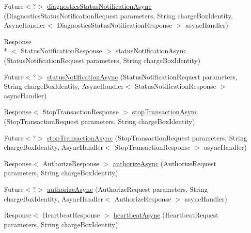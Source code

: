 \begin{DoxyCompactItemize}
\item 
Future$<$?$>$ \hyperlink{classde_1_1rwth_1_1idsg_1_1steve_1_1ocpp_1_1soap_1_1_central_system_service12___soap_server_aa0eab89a8d855dfead2864e84405eb81}{diagnostics\-Status\-Notification\-Async} (Diagnostics\-Status\-Notification\-Request parameters, String charge\-Box\-Identity, Async\-Handler$<$ Diagnostics\-Status\-Notification\-Response $>$ async\-Handler)
\item 
Response\\*
$<$ Status\-Notification\-Response $>$ \hyperlink{classde_1_1rwth_1_1idsg_1_1steve_1_1ocpp_1_1soap_1_1_central_system_service12___soap_server_a2b6c990a4cb7b6721e5d2ea894f4d080}{status\-Notification\-Async} (Status\-Notification\-Request parameters, String charge\-Box\-Identity)
\item 
Future$<$?$>$ \hyperlink{classde_1_1rwth_1_1idsg_1_1steve_1_1ocpp_1_1soap_1_1_central_system_service12___soap_server_a2fd311dcc151cea8dc5ef73b47467f0c}{status\-Notification\-Async} (Status\-Notification\-Request parameters, String charge\-Box\-Identity, Async\-Handler$<$ Status\-Notification\-Response $>$ async\-Handler)
\item 
Response$<$ Stop\-Transaction\-Response $>$ \hyperlink{classde_1_1rwth_1_1idsg_1_1steve_1_1ocpp_1_1soap_1_1_central_system_service12___soap_server_a47c89e5c2a769646d99add8a00884970}{stop\-Transaction\-Async} (Stop\-Transaction\-Request parameters, String charge\-Box\-Identity)
\item 
Future$<$?$>$ \hyperlink{classde_1_1rwth_1_1idsg_1_1steve_1_1ocpp_1_1soap_1_1_central_system_service12___soap_server_ade5a75436a3231a5524333716f73c999}{stop\-Transaction\-Async} (Stop\-Transaction\-Request parameters, String charge\-Box\-Identity, Async\-Handler$<$ Stop\-Transaction\-Response $>$ async\-Handler)
\item 
Response$<$ Authorize\-Response $>$ \hyperlink{classde_1_1rwth_1_1idsg_1_1steve_1_1ocpp_1_1soap_1_1_central_system_service12___soap_server_a0624d94fff1c8dfbb12965a161948fb3}{authorize\-Async} (Authorize\-Request parameters, String charge\-Box\-Identity)
\item 
Future$<$?$>$ \hyperlink{classde_1_1rwth_1_1idsg_1_1steve_1_1ocpp_1_1soap_1_1_central_system_service12___soap_server_ab40e495892f28bfb2d868cbf11334cde}{authorize\-Async} (Authorize\-Request parameters, String charge\-Box\-Identity, Async\-Handler$<$ Authorize\-Response $>$ async\-Handler)
\item 
Response$<$ Heartbeat\-Response $>$ \hyperlink{classde_1_1rwth_1_1idsg_1_1steve_1_1ocpp_1_1soap_1_1_central_system_service12___soap_server_a68df4beb1a70c0ea13fbd2e98d80c8ee}{heartbeat\-Async} (Heartbeat\-Request parameters, String charge\-Box\-Identity)

\end{DoxyCompactItemize}
